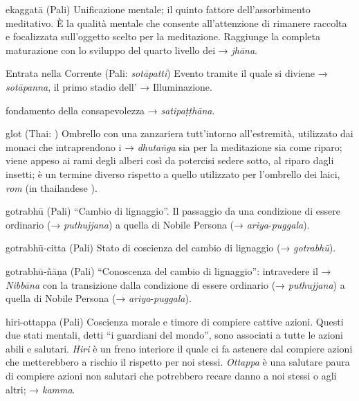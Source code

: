 \begin{glossarydescription}

\item[ekaggatā] (Pali) Unificazione mentale; il quinto fattore
dell'assorbimento meditativo. È la qualità mentale che consente
all'attenzione di rimanere raccolta e focalizzata sull'oggetto scelto
per la meditazione. Raggiunge la completa maturazione con lo sviluppo
del quarto livello dei → \emph{jhāna}.

\item[Entrata nella Corrente] (Pali: \emph{sotāpatti}) Evento tramite il quale si
diviene → \emph{sotāpanna}, il primo stadio dell' → Illuminazione.


\item[fondamento della consapevolezza] → \emph{satipaṭṭhāna}.


\item[glot] (Thai: ) Ombrello con una zanzariera
tutt'intorno all'estremità, utilizzato dai monaci che intraprendono i →
\emph{dhutaṅga} sia per la meditazione sia come riparo; viene appeso ai
rami degli alberi così da potercisi sedere sotto, al riparo dagli
insetti; è un termine diverso rispetto a quello utilizzato per
l'ombrello dei laici, \emph{rom} (in thailandese ).

\item[gotrabhū] (Pali) ``Cambio di lignaggio''. Il passaggio da una condizione
di essere ordinario (→ \emph{puthujjana}) a quella di Nobile Persona (→
\emph{ariya}-\emph{puggala}).

\item[gotrabhū-citta] (Pali) Stato di coscienza del cambio di lignaggio (→
\emph{gotrabhū}).

\item[gotrabhū-ñāṇa] (Pali) ``Conoscenza del cambio di lignaggio'':
intravedere il → \emph{Nibbāna} con la transizione dalla condizione di
essere ordinario (→ \emph{puthujjana}) a quella di Nobile Persona (→
\emph{ariya}-\emph{puggala}).


\item[hiri-ottappa] (Pali) Coscienza morale e timore di compiere cattive
azioni. Questi due stati mentali, detti ``i guardiani del mondo'', sono
associati a tutte le azioni abili e salutari. \emph{Hiri} è un freno
interiore il quale ci fa astenere dal compiere azioni che metterebbero a
rischio il rispetto per noi stessi. \emph{Ottappa} è una salutare paura
di compiere azioni non salutari che potrebbero recare danno a noi stessi
o agli altri; → \emph{kamma}.


\end{glossarydescription}
